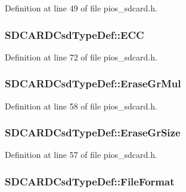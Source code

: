 Definition at line 49 of file pios\-\_\-sdcard.\-h.

\hypertarget{group___p_i_o_s___s_d_c_a_r_d_ga5e147c22c2995b291b7a5ea1a600c5a0}{
\subsubsection[{E\-C\-C}]{ S\-D\-C\-A\-R\-D\-Csd\-Type\-Def\-::\-E\-C\-C}}\label{group___p_i_o_s___s_d_c_a_r_d_ga5e147c22c2995b291b7a5ea1a600c5a0}


Definition at line 72 of file pios\-\_\-sdcard.\-h.

\hypertarget{group___p_i_o_s___s_d_c_a_r_d_gaaba9c6de9483b08af94542e59c76107e}{
\subsubsection[{Erase\-Gr\-Mul}]{ S\-D\-C\-A\-R\-D\-Csd\-Type\-Def\-::\-Erase\-Gr\-Mul}}\label{group___p_i_o_s___s_d_c_a_r_d_gaaba9c6de9483b08af94542e59c76107e}


Definition at line 58 of file pios\-\_\-sdcard.\-h.

\hypertarget{group___p_i_o_s___s_d_c_a_r_d_ga23248a27a48bd1603990d88bc6e6825b}{
\subsubsection[{Erase\-Gr\-Size}]{ S\-D\-C\-A\-R\-D\-Csd\-Type\-Def\-::\-Erase\-Gr\-Size}}\label{group___p_i_o_s___s_d_c_a_r_d_ga23248a27a48bd1603990d88bc6e6825b}


Definition at line 57 of file pios\-\_\-sdcard.\-h.

\hypertarget{group___p_i_o_s___s_d_c_a_r_d_gaf227b9cb873b11bbee9ce41d8bcaa3d1}{
\subsubsection[{File\-Format}]{ S\-D\-C\-A\-R\-D\-Csd\-Type\-Def\-::\-File\-Format}}\label{group___p_i_o_s___s_d_c_a_r_d_gaf227b9cb873b11bbee9ce41d8bcaa3d1}


